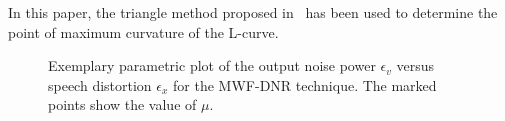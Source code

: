 \documentclass[draftcls,onecolumn,11pt]{IEEEtran}
\begin{document}
In this paper, the triangle method proposed in~\cite{Castellanos_2002} has been used to determine the point of maximum curvature of the L-curve.
\begin{figure}[t!]
\centering
%
\caption{Exemplary parametric plot of the output noise power $\epsilon_v$ versus speech distortion $\epsilon_x$ for the MWF-DNR technique. The marked points show the value of $\mu$.}
\label{fig: L2}
\end{figure}
\end{document}
